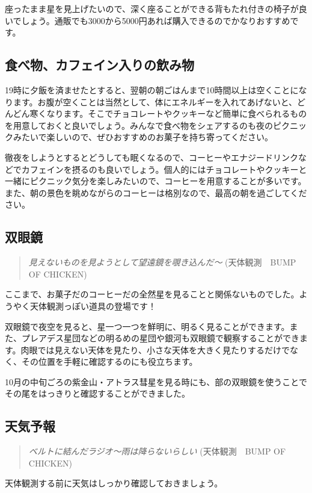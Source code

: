 \documentclass[../../super_nova_2024]{subfiles}
\begin{document}
座ったまま星を見上げたいので、深く座ることができる背もたれ付きの椅子が良いでしょう。通販でも3000から5000円あれば購入できるのでかなりおすすめです。

\subsection{食べ物、カフェイン入りの飲み物}
19時に夕飯を済ませたとすると、翌朝の朝ごはんまで10時間以上は空くことになります。お腹が空くことは当然として、体にエネルギーを入れてあげないと、どんどん寒くなります。そこでチョコレートやクッキーなど簡単に食べられるものを用意しておくと良いでしょう。みんなで食べ物をシェアするのも夜のピクニックみたいで楽しいので、ぜひおすすめのお菓子を持ち寄ってください。

徹夜をしようとするとどうしても眠くなるので、コーヒーやエナジードリンクなどでカフェインを摂るのも良いでしょう。個人的にはチョコレートやクッキーと一緒にピクニック気分を楽しみたいので、コーヒーを用意することが多いです。また、朝の景色を眺めながらのコーヒーは格別なので、最高の朝を過ごしてください。

\subsection{双眼鏡}
\begin{verse}
  {\slshape
  見えないものを見ようとして望遠鏡を覗き込んだ〜
  }
  {\footnotesize(天体観測　BUMP OF CHICKEN)}
\end{verse}


ここまで、お菓子だのコーヒーだの全然星を見ることと関係ないものでした。ようやく天体観測っぽい道具の登場です！

双眼鏡で夜空を見ると、星一つ一つを鮮明に、明るく見ることができます。また、プレアデス星団などの明るめの星団や銀河も双眼鏡で観察することができます。肉眼では見えない天体を見たり、小さな天体を大きく見たりするだけでなく、その位置を手軽に確認するのにも役立ちます。

10月の中旬ごろの紫金山・アトラス彗星を見る時にも、部の双眼鏡を使うことでその尾をはっきりと確認することができました。

\subsection{天気予報}
\begin{verse}
  {\slshape
    ベルトに結んだラジオ〜雨は降らないらしい
  }
  {\footnotesize(天体観測　BUMP OF CHICKEN)}
\end{verse}
天体観測する前に天気はしっかり確認しておきましょう。
\end{document}
